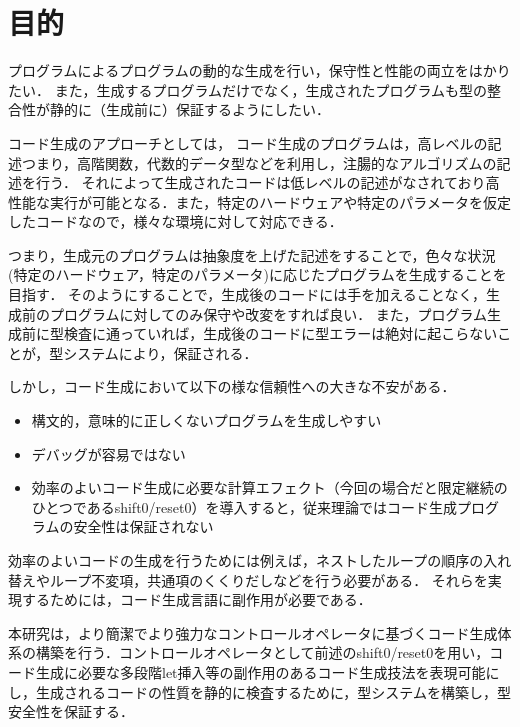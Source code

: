 \documentclass[10pt,a4j,xcolor=dvipsnames,twocolumn]{jarticle}
\theoremstyle{definition}
\begin{document}
\section{目的}
プログラムによるプログラムの動的な生成を行い，保守性と性能の両立をはかりたい．
また，生成するプログラムだけでなく，生成されたプログラムも型の整合性が静的に（生成前に）保証するようにしたい．

コード生成のアプローチとしては，
コード生成のプログラムは，高レベルの記述つまり，高階関数，代数的データ型などを利用し，注腸的なアルゴリズムの記述を行う．
それによって生成されたコードは低レベルの記述がなされており高性能な実行が可能となる．また，特定のハードウェアや特定のパラメータを仮定したコードなので，様々な環境に対して対応できる．

つまり，生成元のプログラムは抽象度を上げた記述をすることで，色々な状況(特定のハードウェア，特定のパラメータ)に応じたプログラムを生成することを目指す．
そのようにすることで，生成後のコードには手を加えることなく，生成前のプログラムに対してのみ保守や改変をすれば良い．
また，プログラム生成前に型検査に通っていれば，生成後のコードに型エラーは絶対に起こらないことが，型システムにより，保証される．

しかし，コード生成において以下の様な信頼性への大きな不安がある．

\begin{itemize}
\item 構文的，意味的に正しくないプログラムを生成しやすい
\item デバッグが容易ではない
\item 効率のよいコード生成に必要な計算エフェクト（今回の場合だと限定継続のひとつであるshift0/reset0）を導入すると，従来理論ではコード生成プログラムの安全性は保証されない
\end{itemize}

効率のよいコードの生成を行うためには例えば，ネストしたループの順序の入れ替えやループ不変項，共通項のくくりだしなどを行う必要がある．
それらを実現するためには，コード生成言語に副作用が必要である．

本研究は，より簡潔でより強力なコントロールオペレータに基づくコード生成体系の構築を行う．コントロールオペレータとして前述のshift0/reset0を用い，コード生成に必要な多段階let挿入等の副作用のあるコード生成技法を表現可能にし，生成されるコードの性質を静的に検査するために，型システムを構築し，型安全性を保証する．
\end{document}
